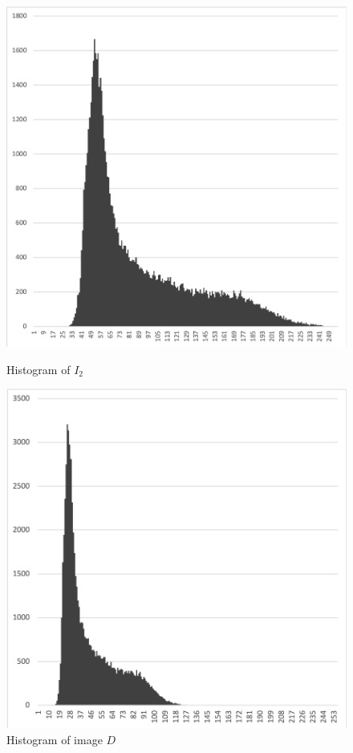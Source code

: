 \documentclass[12pt,a4paper,notitlepage,oneside,amsmath,amssymb]{article}
\begin{document}
\begin{CJK*}{UTF8}{bkai}
\begin{enumerate}[label=(\alph*)]
          \begin{figure}[hbt!]
            \centering
            \begin{minipage}{.33\textwidth}
              \centering
              \includegraphics[width=.8\linewidth]{hist_I2}
              \caption*{Histogram of \(I_2\)}
            \end{minipage}%
            \begin{minipage}{.33\textwidth}
              \centering
              \includegraphics[width=.8\linewidth]{hist_D}
              \caption*{Histogram of image \(D\)}
            \end{minipage}%

\end{figure}
\end{enumerate}
\end{CJK*}
\end{document}
